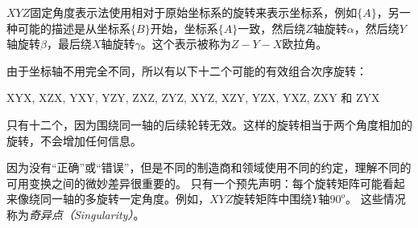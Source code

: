 
$XYZ$固定角度表示法使用相对于原始坐标系的旋转来表示坐标系，例如$\{A\}$，另一种可能的描述是从坐标系$\{B\}$开始，坐标系$\{A\}$一致，然后绕$Z$轴旋转$\alpha$，然后绕$Y$轴旋转$\beta$，最后绕$X$轴旋转$\gamma$。这个表示被称为$Z-Y-X$欧拉角。


由于坐标轴不用完全不同，所以有以下十二个可能的有效组合次序旋转：

\begin{center}
XYX, XZX, YXY, YZY, ZXZ, ZYZ, XYZ, XZY, YZX, YXZ, ZXY 和 ZYX
\end{center}

只有十二个，因为围绕同一轴的后续轮转无效。这样的旋转相当于两个角度相加的旋转，不会增加任何信息。


因为没有“正确”或“错误”，但是不同的制造商和领域使用不同的约定，理解不同的可用变换之间的微妙差异很重要的。 只有一个预先声明：每个旋转矩阵可能看起来像绕同一轴的多旋转一定角度。例如，$XYZ$旋转矩阵中围绕$Y$轴$90^o$。 这些情况称为\emph{奇异点（Singularity）}。


